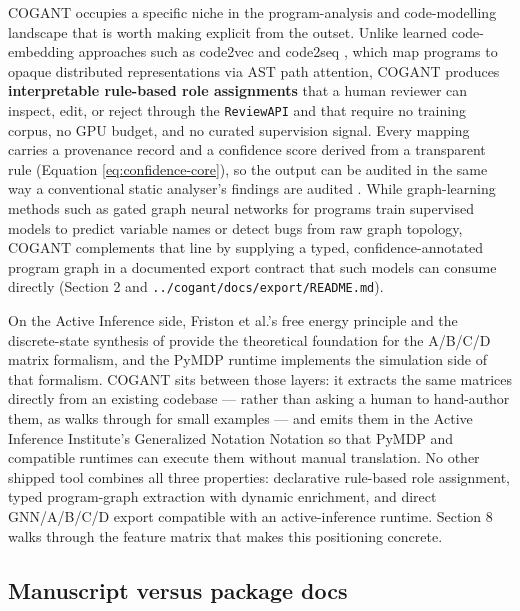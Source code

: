 \documentclass[
]{article}
\begin{document}
COGANT occupies a specific niche in the program-analysis and
code-modelling landscape that is worth making explicit from the outset.
Unlike learned code-embedding approaches such as code2vec and code2seq
\citep{alon2019code2vec}, which map programs to opaque distributed
representations via AST path attention, COGANT produces
\textbf{interpretable rule-based role assignments} that a human reviewer
can inspect, edit, or reject through the \texttt{ReviewAPI} and that
require no training corpus, no GPU budget, and no curated supervision
signal. Every mapping carries a provenance record and a confidence score
derived from a transparent rule (Equation \ref{eq:confidence-core}), so
the output can be audited in the same way a conventional static
analyser's findings are audited \citep{yamaguchi2014modeling}. While
graph-learning methods such as gated graph neural networks for programs
\citep{allamanis2018learning, li2016gated} train supervised models to
predict variable names or detect bugs from raw graph topology, COGANT
complements that line by supplying a typed, confidence-annotated program
graph in a documented export contract that such models can consume
directly (Section 2 and \texttt{../cogant/docs/export/README.md}).

On the Active Inference side, Friston et al.'s free energy principle
\citep{friston2010free} and the discrete-state synthesis of
\citep{dacosta2020active} provide the theoretical foundation for the
A/B/C/D matrix formalism, and the PyMDP runtime \citep{heins2022pymdp}
implements the simulation side of that formalism. COGANT sits between
those layers: it extracts the same matrices directly from an existing
codebase --- rather than asking a human to hand-author them, as
\citep{smith2022stepbystep} walks through for small examples --- and
emits them in the Active Inference Institute's Generalized Notation
Notation \citep{friedman2024gnn} so that PyMDP and compatible runtimes
can execute them without manual translation. No other shipped tool
combines all three properties: declarative rule-based role assignment,
typed program-graph extraction with dynamic enrichment, and direct
GNN/A/B/C/D export compatible with an active-inference runtime. Section
8 walks through the feature matrix that makes this positioning concrete.

\subsection{Manuscript versus package
docs}\label{manuscript-versus-package-docs}
\end{document}
